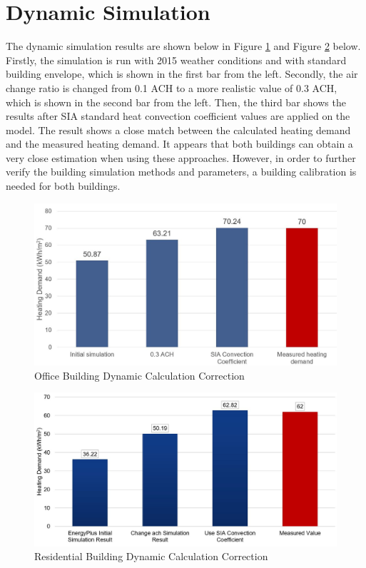 \documentclass[a4paper, oneside]{discothesis}
\begin{document}
		
	\newpage		  
	\section{Dynamic Simulation}		
			The dynamic simulation results are shown below in Figure \ref{fig:Sumatra_EP} and Figure \ref{fig:Hongger_EP} below. Firstly, the simulation is run with 2015 weather conditions and with standard building envelope, which is shown in the first bar from the left. Secondly, the air change ratio is changed from 0.1 ACH to a more realistic value of 0.3 ACH, which is shown in the second bar from the left. Then, the third bar shows the results after SIA standard heat convection coefficient values are applied on the model. The result shows a close match between the calculated heating demand and the measured heating demand. It appears that both buildings can obtain a very close estimation when using these approaches. However, in order to further verify the building simulation methods and parameters, a building calibration is needed for both buildings.
		

		\begin{figure}[htbp]
		\centering
		\includegraphics[scale=0.5]{Office_EP.jpg}
		\caption{Office Building Dynamic Calculation Correction}
		\label{fig:Sumatra_EP}
		\end{figure}

		\begin{figure}[htbp]
		\centering
		\includegraphics[scale=0.4]{Residential_EP.jpg}
		\caption{Residential Building Dynamic Calculation Correction}
		\label{fig:Hongger_EP}
		\end{figure}
		
\end{document}
